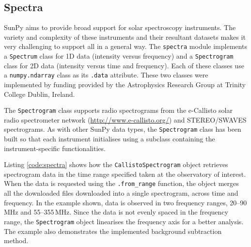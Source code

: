 \subsection{Spectra}\label{sec:spectra}

SunPy aims to provide broad support for solar spectroscopy
instruments.  The variety and complexity of these instruments and
their resultant datasets makes it very challenging to support all in a
general way.  The \texttt{spectra} module implements a
\texttt{Spectrum} class for 1D data (intensity versus frequency) and a
\texttt{Spectrogram} class for 2D data (intensity versus time and
frequency).  Each of these classes use a \texttt{numpy.ndarray} class
as its \texttt{.data} attribute.  These two classes were implemented
by funding provided by the Astrophysics Research Group at Trinity
College Dublin, Ireland.

The \texttt{Spectrogram} class supports radio spectrograms from the e-Callisto 
solar radio spectrometer network (\url{http://www.e-callisto.org/})
and STEREO/SWAVES spectrograms.
As with other SunPy data types, the \texttt{Spectrogram} class has been
built so that each instrument initialises using a subclass containing the instrument-specific 
functionalities.

Listing \ref{code:spectra} shows how the \texttt{CallistoSpectrogram}
object retrieves spectrogram data in the time range specified taken at
the observatory of interest.  When the data is requested using the
\texttt{.from\_range} function, the object merges all the downloaded
files downloaded into a single spectrogram, across time and frequency.
In the example shown, data is observed in two frequency ranges, 
20--90\,MHz and 55--355\,MHz.  Since the data is not evenly spaced in
the frequency range, the \texttt{Spectrogram} object linearises the
frequency axis for a better analysis.  The example also demonstrates
the implemented background subtraction method.

